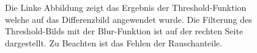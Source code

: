 		\begin{figure}[H]
				\caption{Die Linke Abbildung zeigt das Ergebnis der Threshold-Funktion welche auf das Differenzbild angewendet wurde. Die Filterung des Threshold-Bilds mit der Blur-Funktion ist auf der rechten Seite dargestellt. Zu Beachten ist das Fehlen der Rauschanteile.}
				\end{figure}
			
		

